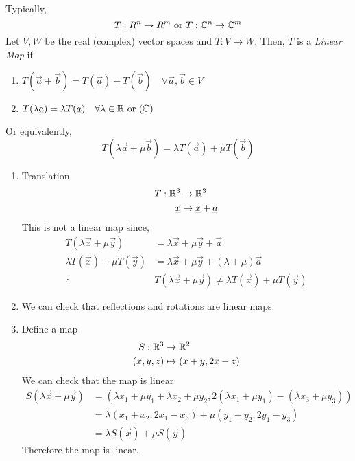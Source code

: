\documentclass{article}
\numberwithin{equation}{section}
\begin{document}
\begin{defi}
    Typically,
    \[
        T: R^n \rightarrow R^m \text{ or } T: \mathbb{C}^n \rightarrow \mathbb{C}^m
    \]
    Let $V, W$ be the real (complex) vector spaces and $T: V \rightarrow W$. 
    Then, $T$ is a \emph{Linear Map} if
    \begin{enumerate}
        \item $T(\vec a + \vec b) = T(\vec a) + T(\vec b) \quad \forall \vec a, \vec b \in V$
        \item $T(\lambda \underline{a}) = \lambda T(\underline{a}) \quad \forall \lambda \in \mathbb{R} \text{ or } (\mathbb{C})$
    \end{enumerate}
    Or equivalently,
    \begin{equation}\label{eq:3-5}
        T(\lambda \vec a + \mu \vec b) = \lambda T(\vec a) + \mu T(\vec b)
    \end{equation}
\end{defi}
\begin{eg}
    \begin{enumerate}
        \item Translation
        \begin{align*}
            T: \mathbb{R}^3 &\rightarrow \mathbb{R}^3 \\
            \underline{x} &\mapsto \underline{x} + \underline{a}
        \end{align*}
        This is not a linear map since,
        \begin{align*}
            T(\lambda \vec x + \mu \vec y) &= \lambda \vec x + \mu \vec y + \vec a \\
            \lambda T(\vec x) + \mu T(\vec y) &= \lambda \vec x + \mu \vec y + (\lambda + \mu) \vec a \\
            \therefore&  T(\lambda \vec x + \mu \vec y) \neq \lambda T(\vec x) + \mu T(\vec y)
        \end{align*}
        \item We can check that reflections and rotations are linear maps.
        \item Define a map
        \begin{align*}
            S: \mathbb{R}^3 &\rightarrow \mathbb{R}^2 \\
                (x, y, z) &\mapsto (x + y, 2x - z)
        \end{align*}
        We can check that the map is linear
        \begin{align*}
            S(\lambda \vec x + \mu \vec y) &= (\lambda x_1 + \mu y_1 + \lambda x_2 + \mu y_2,  2(\lambda x_1 + \mu y_1) - (\lambda x_3 + \mu y_3)) \\
            &= \lambda (x_1 + x_2, 2x_1 - x_3) + \mu (y_1 + y_2, 2y_1 - y_3) \\
            &= \lambda S(\vec{x}) + \mu S(\vec y)
        \end{align*}
        Therefore the map is linear.
    \end{enumerate}
\end{eg}
\end{document}
